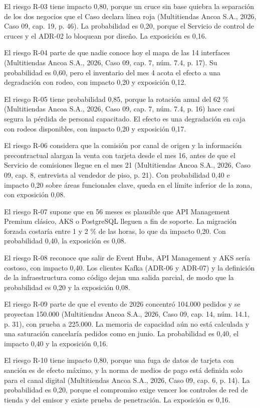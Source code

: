 \documentclass[11pt]{article}
\begin{document}
El riesgo R-03 tiene impacto 0,80, porque un cruce sin base quiebra la separación de los dos negocios que el Caso declara línea roja (Multitiendas Ancoa S.A., 2026, Caso 09, cap. 19, p. 46). La probabilidad es 0,20, porque el Servicio de control de cruces y el ADR-02 lo bloquean por diseño. La exposición es 0,16.

El riesgo R-04 parte de que nadie conoce hoy el mapa de las 14 interfaces (Multitiendas Ancoa S.A., 2026, Caso 09, cap. 7, núm. 7.4, p. 17). Su probabilidad es 0,60, pero el inventario del mes 4 acota el efecto a una degradación con rodeo, con impacto 0,20 y exposición 0,12.

El riesgo R-05 tiene probabilidad 0,85, porque la rotación anual del 62 \% (Multitiendas Ancoa S.A., 2026, Caso 09, cap. 7, núm. 7.4, p. 16) hace casi segura la pérdida de personal capacitado. El efecto es una degradación en caja con rodeos disponibles, con impacto 0,20 y exposición 0,17.

El riesgo R-06 considera que la comisión por canal de origen y la información precontractual alargan la venta con tarjeta desde el mes 16, antes de que el Servicio de comisiones llegue en el mes 21 (Multitiendas Ancoa S.A., 2026, Caso 09, cap. 8, entrevista al vendedor de piso, p. 21). Con probabilidad 0,40 e impacto 0,20 sobre áreas funcionales clave, queda en el límite inferior de la zona, con exposición 0,08.

El riesgo R-07 supone que en 56 meses es plausible que API Management Premium clásico, AKS o PostgreSQL lleguen a fin de soporte. La migración forzada costaría entre 1 y 2 \% de las horas, lo que da impacto 0,20. Con probabilidad 0,40, la exposición es 0,08.

El riesgo R-08 reconoce que salir de Event Hubs, API Management y AKS sería costoso, con impacto 0,40. Los clientes Kafka (ADR-06 y ADR-07) y la definición de la infraestructura como código dejan una salida parcial, de modo que la probabilidad es 0,20 y la exposición 0,08.

El riesgo R-09 parte de que el evento de 2026 concentró 104.000 pedidos y se proyectan 150.000 (Multitiendas Ancoa S.A., 2026, Caso 09, cap. 14, núm. 14.1, p. 31), con prueba a 225.000. La memoria de capacidad aún no está calculada y una saturación cancelaría pedidos como en junio. La probabilidad es 0,40, el impacto 0,40 y la exposición 0,16.

El riesgo R-10 tiene impacto 0,80, porque una fuga de datos de tarjeta con sanción es de efecto máximo, y la norma de medios de pago está definida solo para el canal digital (Multitiendas Ancoa S.A., 2026, Caso 09, cap. 6, p. 14). La probabilidad es 0,20, porque el compromiso exige vencer los controles de red de tienda y del emisor y existe prueba de penetración. La exposición es 0,16.
\end{document}
